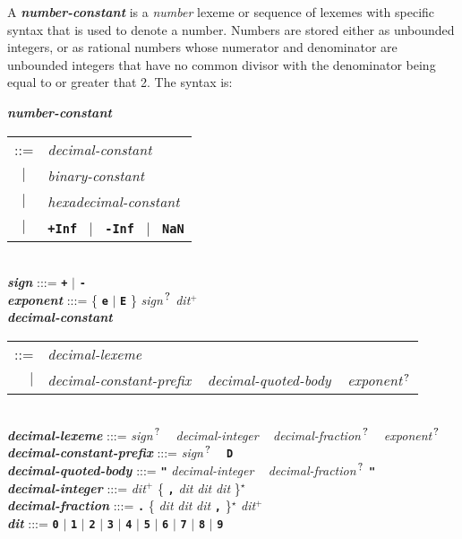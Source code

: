 \documentclass[12pt]{article}
\newcommand{\TT}[1]{{\tt \bfseries #1}}
\newcommand{\STAR}{{\Large $^\star$}}
\newcommand{\PLUS}[1][]{{$^{+#1}$}}
\newcommand{\QMARK}{{$^{\,\mbox{\footnotesize ?}}$}}
\newcommand{\ttkey}[1]{{\tt \bfseries #1}}
\newcommand{\emkey}[1]{{\em \bfseries #1}}
\newenvironment{indpar}[1][0.3in]%
	{\begin{list}{}%
		     {\setlength{\itemsep}{0in}%
		      \setlength{\topsep}{0in}%
		      \setlength{\parsep}{1ex}%
		      \setlength{\labelwidth}{#1}%
		      \setlength{\leftmargin}{#1}%
		      \addtolength{\leftmargin}{\labelsep}}%
	 \item}%
	{\end{list}}
\begin{document}
A \emkey{number-constant} is a {\em number} lexeme or sequence of
lexemes with specific syntax
that is used to denote a number.  Numbers are stored either
as unbounded integers, or as rational numbers whose numerator
and denominator are unbounded integers that have no common divisor
with the denominator being equal to or greater that 2.  The syntax is:

\begin{indpar}
\emkey{number-constant}\label{NUMBER-CONSTANT}
    \begin{tabular}[t]{@{}cl}
    ::= & {\em decimal-constant} \\
    $|$ & {\em binary-constant} \\
    $|$ & {\em hexadecimal-constant} \\
    $|$ & \TT{+Inf}\index{Inf@\TT{+Inf}}
          ~$|$~ \TT{-Inf}\index{Inf@\TT{-Inf}}
          ~$|$~ \ttkey{NaN}
    \end{tabular}
\\[0.5ex]
\emkey{sign} :::= \TT{+} $|$ \TT{-} \\
\emkey{exponent} :::=
	\{ \TT{e} $|$ \TT{E} \} {\em sign}\QMARK{} {\em dit}\PLUS{}
\\[0.5ex]
\emkey{decimal-constant} \begin{tabular}[t]{@{}rl@{}}
                         ::= & {\em decimal-lexeme} \\
			 $|$ & {\em decimal-constant-prefix} ~
			       {\em decimal-quoted-body} ~
			       {\em exponent}\QMARK{}
			 \end{tabular}
\\[0.5ex]
\emkey{decimal-lexeme} :::= {\em sign}\QMARK{} ~ {\em decimal-integer} ~
			    {\em decimal-fraction}\QMARK{} ~
                            {\em exponent}\QMARK{}
\\[0.5ex]
\emkey{decimal-constant-prefix} :::= {\em sign}\QMARK{} ~ \TT{D}
\\[0.5ex]
\emkey{decimal-quoted-body} :::= \TT{"} {\em decimal-integer} ~
				 {\em decimal-fraction}\QMARK{} \TT{"}
\\[0.5ex]
\emkey{decimal-integer}
    :::= {\em dit}\PLUS{} 
         \{ \TT{,} {\em dit} {\em dit} {\em dit} \}\STAR{} \\
\emkey{decimal-fraction} :::=
    \TT{.} \{ {\em dit} {\em dit} {\em dit} \TT{,} \}\STAR{}
           {\em dit}\PLUS{} \\
\emkey{dit}\label{DIT}
	:::= \TT{0} $|$ \TT{1} $|$ \TT{2} $|$ \TT{3} $|$ \TT{4}
                    $|$ \TT{5} $|$ \TT{6} $|$ \TT{7} $|$ \TT{8} $|$ \TT{9}

\end{indpar}
\end{document}
